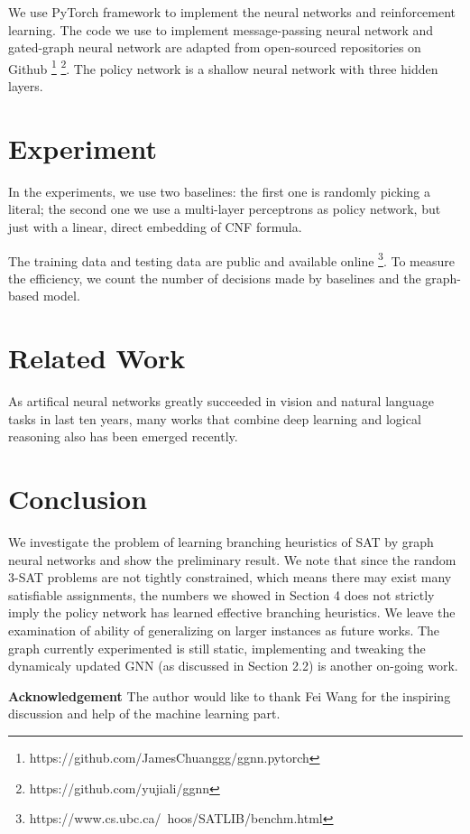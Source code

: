 \documentclass[sigplan,10pt]{acmart}\settopmatter{printfolios=true,printccs=false,printacmref=false}
\begin{document}
We use PyTorch framework to implement the neural networks and reinforcement learning.
The code we use to implement message-passing neural network and gated-graph neural network 
are adapted from open-sourced repositories on Github 
\footnote{https://github.com/JamesChuanggg/ggnn.pytorch} 
\footnote{https://github.com/yujiali/ggnn}.
The policy network is a shallow neural network with three hidden layers.

\section{Experiment}

In the experiments, we use two baselines: the first one is randomly picking a literal; 
the second one we use a multi-layer perceptrons as policy network, but just with 
a linear, direct embedding of CNF formula.

The training data and testing data are public and available online 
\footnote{https://www.cs.ubc.ca/~hoos/SATLIB/benchm.html}.
To measure the efficiency, we count the number of decisions made by baselines and the 
graph-based model.

\section{Related Work}

As artifical neural networks greatly succeeded in vision and natural language tasks in last ten years,
many works that combine deep learning and logical reasoning also has been emerged recently.

\section{Conclusion}

We investigate the problem of learning branching heuristics of SAT by 
graph neural networks and show the preliminary result. 
We note that since the random 3-SAT problems are not tightly constrained,
which means there may exist many satisfiable assignments, the numbers we showed
in Section 4 does not strictly imply the policy network has learned effective
branching heuristics. We leave the examination of ability of generalizing
on larger instances as future works. The graph currently experimented is still 
static, implementing and tweaking the dynamicaly updated GNN (as discussed in 
Section 2.2) is another on-going work.

\textbf{Acknowledgement} The author would like to thank Fei Wang for the inspiring discussion and 
help of the machine learning part.
\end{document}
